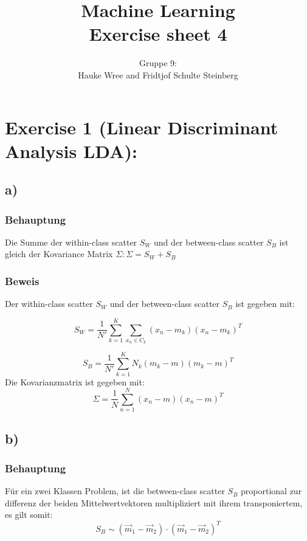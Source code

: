 \documentclass[a4paper,parskip=full-]{article}
\title{Machine Learning \\
Exercise sheet 4}
\author{Gruppe 9: \\Hauke Wree and Fridtjof Schulte Steinberg}
\begin{document}
\maketitle

\section{Exercise 1 (Linear Discriminant Analysis LDA):}
\subsection{a)}

\subsubsection{Behauptung}
Die Summe der within-class scatter $S_W$ 
und der between-class scatter $S_B$ 
ist gleich der Kovariance Matrix $\Sigma:\Sigma = S_W + S_B$

\subsubsection{Beweis}
Der within-class scatter $S_W$ und der between-class scatter $S_B$ ist gegeben mit:

$$
S_W = \frac{1}{N'} \sum^K_{k=1} \sum_{x_n \in C_k} (x_n-m_k)(x_n-m_k)^T
$$

$$
S_B = \frac{1}{N'} \sum^K_{k=1} N_k (m_k-m)(m_k-m)^T
$$
Die Kovarianzmatrix ist gegeben mit:
$$
\Sigma =  \frac{1}{N} \sum^N_{n=1} (x_n-m)(x_n-m)^T
$$

\subsection{b)}
\subsubsection{Behauptung}
Für ein zwei Klassen Problem, ist die between-class scatter $S_B$ proportional zur differenz der beiden Mittelwertvektoren multipliziert mit ihrem transponiertem, es gilt somit:
$$
S_B \sim (\vec{m}_1 - \vec{m}_2) \cdot \left( \vec{m}_1 - \vec{m}_2 \right)^T
$$
\end{document}
